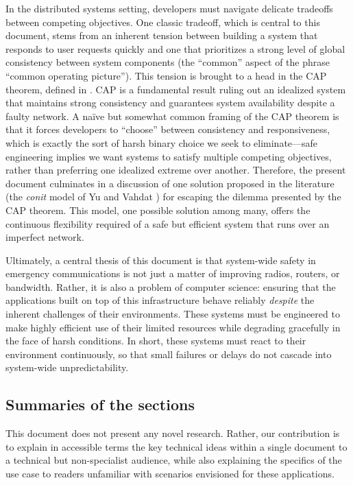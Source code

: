 \documentclass[]             %
{NASA}                       %
\theoremstyle{definition}
\begin{document}
In the distributed systems setting, developers must navigate delicate tradeoffs between competing objectives. One classic tradeoff, which is central to this document, stems from an inherent tension between building a system that responds to user requests quickly and one that prioritizes a strong level of global consistency between system components (the ``common'' aspect of the phrase ``common operating picture''). This tension is brought to a head in the CAP theorem, defined in . CAP is a fundamental result ruling out an idealized system that maintains strong consistency and guarantees system availability despite a faulty network. A na\"ive but somewhat common framing of the CAP theorem is that it forces developers to ``choose'' between consistency and responsiveness, which is exactly the sort of harsh binary choice we seek to eliminate---safe engineering implies we want systems to satisfy multiple competing objectives, rather than preferring one idealized extreme over another. Therefore, the present document culminates in a discussion of one solution proposed in the literature (the \emph{conit} model of Yu and Vahdat \cite{2002tact}) for escaping the dilemma presented by the CAP theorem. This model, one possible solution among many, offers the continuous flexibility required of a safe but efficient system that runs over an imperfect network.



Ultimately, a central thesis of this document is that system-wide safety in emergency communications is not just a matter of improving radios, routers, or bandwidth. Rather, it is also a problem of computer science: ensuring that the applications built on top of this infrastructure behave reliably \emph{despite} the inherent challenges of their environments.  These systems must be engineered to make highly efficient use of their limited resources while degrading gracefully in the face of harsh conditions. In short, these systems must react to their environment continuously, so that small failures or delays do not cascade into system-wide unpredictability.


\subsection{Summaries of the sections}\label{ssec:summaries-of-the-sections}
This document does not present any novel research. Rather, our contribution is to explain in accessible terms the key technical ideas within a single document to a technical but non-specialist audience, while also explaining the specifics of the use case to readers unfamiliar with scenarios envisioned for these applications.
\end{document}
